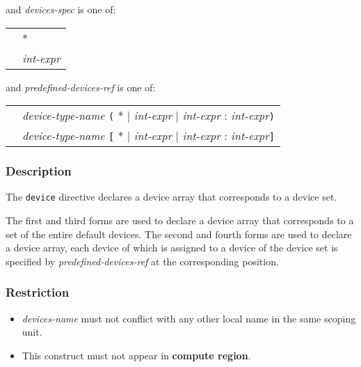 \vspace{1em}
and {\it devices-spec} is one of:
\vspace{1em}

\begin{tabular}{ll}
 \hspace{0.5cm} & * \\
                & {\it int-expr}
\end{tabular}

\vspace{1em}
and {\it predefined-devices-ref} is one of:
\vspace{1em}

\begin{tabular}{ll}
  \hspace{0.5cm} & {\it device-type-name} \verb|(| * $\vert$ {\it int-expr} $\vert$ {\it int-expr} : {\it int-expr}\verb|)| \\
                 & {\it device-type-name} \verb|[| * $\vert$ {\it int-expr} $\vert$ {\it int-expr} : {\it int-expr}\verb|]|
\end{tabular}

\subsubsection*{Description}
The {\tt device} directive declares a device array that corresponds to a device set.

The first and third forms are used to declare a device array that corresponds to a set of the entire default devices.
The second and fourth forms are used to declare a device array, each device of which is
assigned to a device of the device set is specified by {\it predefined-devices-ref} at the corresponding position.


\subsubsection*{Restriction}
\begin{itemize}
\item {\it devices-name} must not conflict with any other local name in
      the same scoping unit.
 \item This construct must not appear in {\OACC} {\bf compute region}.
\end{itemize}

